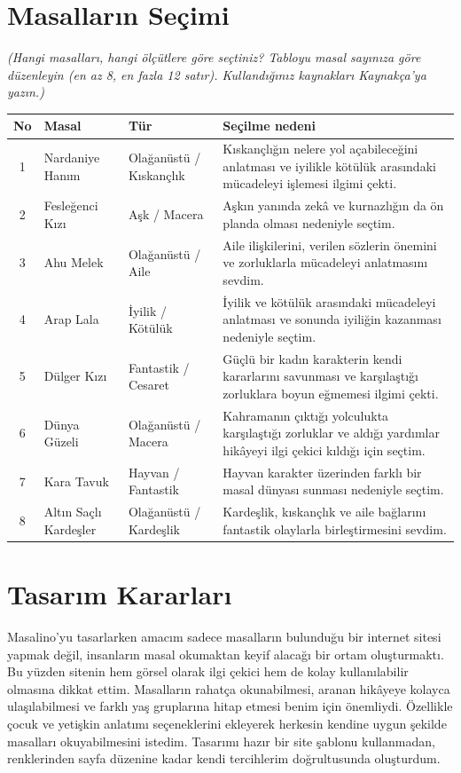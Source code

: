 \documentclass[12pt,a4paper]{article}
\newcommand{\aciklama}[1]{{\color{gray}\itshape (#1)}}
\begin{document}
\section{Masalların Seçimi}
\aciklama{Hangi masalları, hangi ölçütlere göre seçtiniz? Tabloyu masal sayınıza göre
düzenleyin (en az 8, en fazla 12 satır). Kullandığınız kaynakları Kaynakça'ya yazın.}

\begin{longtable}{@{}cp{4cm}p{3cm}p{5.4cm}@{}}
\toprule
\textbf{No} & \textbf{Masal} & \textbf{Tür} & \textbf{Seçilme nedeni} \\
\midrule
\endhead
1 & Nardaniye Hanım & Olağanüstü / Kıskançlık & Kıskançlığın nelere yol açabileceğini anlatması ve iyilikle kötülük arasındaki mücadeleyi işlemesi ilgimi çekti. \\
2 & Fesleğenci Kızı & Aşk / Macera & Aşkın yanında zekâ ve kurnazlığın da ön planda olması nedeniyle seçtim. \\
3 & Ahu Melek & Olağanüstü / Aile & Aile ilişkilerini, verilen sözlerin önemini ve zorluklarla mücadeleyi anlatmasını sevdim. \\
4 & Arap Lala & İyilik / Kötülük & İyilik ve kötülük arasındaki mücadeleyi anlatması ve sonunda iyiliğin kazanması nedeniyle seçtim. \\
5 & Dülger Kızı & Fantastik / Cesaret & Güçlü bir kadın karakterin kendi kararlarını savunması ve karşılaştığı zorluklara boyun eğmemesi ilgimi çekti. \\
6 & Dünya Güzeli & 	Olağanüstü / Macera & Kahramanın çıktığı yolculukta karşılaştığı zorluklar ve aldığı yardımlar hikâyeyi ilgi çekici kıldığı için seçtim. \\
7 & Kara Tavuk & Hayvan / Fantastik & Hayvan karakter üzerinden farklı bir masal dünyası sunması nedeniyle seçtim. \\
8 & Altın Saçlı Kardeşler & Olağanüstü / Kardeşlik & Kardeşlik, kıskançlık ve aile bağlarını fantastik olaylarla birleştirmesini sevdim. \\
\bottomrule
\end{longtable}

\section{Tasarım Kararları}
Masalino'yu tasarlarken amacım sadece masalların bulunduğu bir internet sitesi yapmak değil, insanların masal okumaktan keyif alacağı bir ortam oluşturmaktı. Bu yüzden sitenin hem görsel olarak ilgi çekici hem de kolay kullanılabilir olmasına dikkat ettim. Masalların rahatça okunabilmesi, aranan hikâyeye kolayca ulaşılabilmesi ve farklı yaş gruplarına hitap etmesi benim için önemliydi. Özellikle çocuk ve yetişkin anlatımı seçeneklerini ekleyerek herkesin kendine uygun şekilde masalları okuyabilmesini istedim. Tasarımı hazır bir site şablonu kullanmadan, renklerinden sayfa düzenine kadar kendi tercihlerim doğrultusunda oluşturdum.
\end{document}
